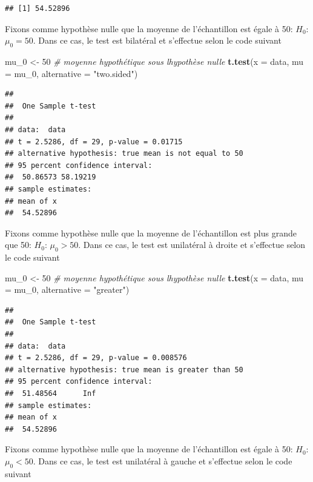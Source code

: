 \documentclass[
]{book}
\newenvironment{Shaded}{\begin{snugshade}}{\end{snugshade}}
\newcommand{\AttributeTok}[1]{\textcolor[rgb]{0.13,0.29,0.53}{#1}}
\newcommand{\CommentTok}[1]{\textcolor[rgb]{0.56,0.35,0.01}{\textit{#1}}}
\newcommand{\DecValTok}[1]{\textcolor[rgb]{0.00,0.00,0.81}{#1}}
\newcommand{\FunctionTok}[1]{\textcolor[rgb]{0.13,0.29,0.53}{\textbf{#1}}}
\newcommand{\NormalTok}[1]{#1}
\newcommand{\OtherTok}[1]{\textcolor[rgb]{0.56,0.35,0.01}{#1}}
\newcommand{\StringTok}[1]{\textcolor[rgb]{0.31,0.60,0.02}{#1}}
\begin{document}
\begin{verbatim}
## [1] 54.52896
\end{verbatim}

Fixons comme hypothèse nulle que la moyenne de l'échantillon est égale à 50: \(H_{0}\): \(\mu_{0}=50\). Dans ce cas, le test est bilatéral et s'effectue selon le code suivant

\begin{Shaded}
\begin{Highlighting}[]
\NormalTok{mu\_0 }\OtherTok{\textless{}{-}} \DecValTok{50}  \CommentTok{\# moyenne hypothétique sous l\textquotesingle{}hypothèse nulle }
\FunctionTok{t.test}\NormalTok{(}\AttributeTok{x =}\NormalTok{ data, }\AttributeTok{mu =}\NormalTok{ mu\_0, }\AttributeTok{alternative =} \StringTok{"two.sided"}\NormalTok{)}
\end{Highlighting}
\end{Shaded}

\begin{verbatim}
## 
##  One Sample t-test
## 
## data:  data
## t = 2.5286, df = 29, p-value = 0.01715
## alternative hypothesis: true mean is not equal to 50
## 95 percent confidence interval:
##  50.86573 58.19219
## sample estimates:
## mean of x 
##  54.52896
\end{verbatim}

Fixons comme hypothèse nulle que la moyenne de l'échantillon est plus grande que 50: \(H_{0}\): \(\mu_{0}>50\). Dans ce cas, le test est unilatéral à droite et s'effectue selon le code suivant

\begin{Shaded}
\begin{Highlighting}[]
\NormalTok{mu\_0 }\OtherTok{\textless{}{-}} \DecValTok{50}  \CommentTok{\# moyenne hypothétique sous l\textquotesingle{}hypothèse nulle }
\FunctionTok{t.test}\NormalTok{(}\AttributeTok{x =}\NormalTok{ data, }\AttributeTok{mu =}\NormalTok{ mu\_0, }\AttributeTok{alternative =} \StringTok{"greater"}\NormalTok{)}
\end{Highlighting}
\end{Shaded}

\begin{verbatim}
## 
##  One Sample t-test
## 
## data:  data
## t = 2.5286, df = 29, p-value = 0.008576
## alternative hypothesis: true mean is greater than 50
## 95 percent confidence interval:
##  51.48564      Inf
## sample estimates:
## mean of x 
##  54.52896
\end{verbatim}

Fixons comme hypothèse nulle que la moyenne de l'échantillon est égale à 50: \(H_{0}\): \(\mu_{0}<50\). Dans ce cas, le test est unilatéral à gauche et s'effectue selon le code suivant
\end{document}
